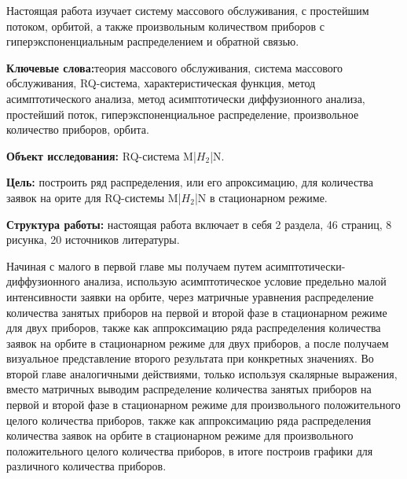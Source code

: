 Настоящая работа изучает систему массового обслуживания, с простейшим потоком, орбитой, а также произвольным количеством приборов с гиперэкспоненциальным распределением и обратной связью.

\textbf{Ключевые слова:}теория массового обслуживания, система массового обслуживания, RQ-система, характеристическая функция, метод асимптотического анализа, метод асимптотически диффузионного анализа, простейший поток, гиперэкспоненциальное распределение, произвольное количество приборов, орбита.

\textbf{Объект исследования:} RQ-система M|$H_2$|N.

\textbf{Цель:} построить ряд распределения, или его апроксимацию, для количества заявок на орите для RQ-системы M|$H_2$|N в стационарном режиме.

\textbf{Структура работы:} настоящая работа включает в себя 2 раздела, 46 страниц, 8 рисунка, 20 источников литературы.

Начиная с малого в первой главе мы получаем путем асимптотически-диффузионного анализа, использую асимптотическое условие предельно малой интенсивности заявки на орбите, через матричные уравнения распределение количества занятых приборов на первой и второй фазе в стационарном режиме для двух приборов, также как аппроксимацию ряда распределения количества заявок на орбите в стационарном режиме для двух приборов, а после получаем визуальное представление второго результата при конкретных значениях. 
Во второй главе аналогичными действиями, только используя скалярные выражения, вместо матричных выводим распределение количества занятых приборов на первой и второй фазе в стационарном режиме для произвольного положительного целого количества приборов, также как аппроксимацию ряда распределения количества заявок на орбите в стационарном режиме для произвольного положительного целого количества приборов, в итоге построив графики для различного количества приборов.







